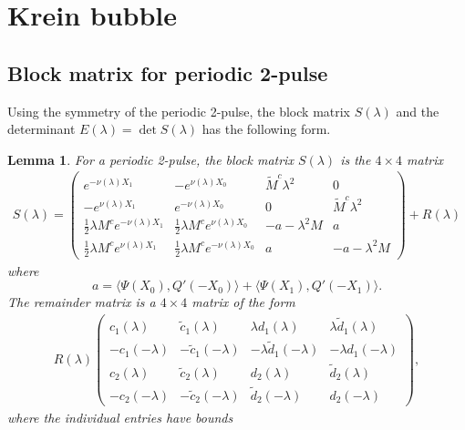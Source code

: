 \documentclass[10pt,reqno]{amsart}
\theoremstyle{plain}
\newtheorem{lemma}[theorem]{Lemma}
\theoremstyle{definition}
\theoremstyle{remark}
\numberwithin{theorem}{section}
\numberwithin{equation}{section}
\begin{document}
\section{Krein bubble}

\subsection{Block matrix for periodic 2-pulse}

Using the symmetry of the periodic 2-pulse, the block matrix $S(\lambda)$ and the determinant $E(\lambda) = \det S(\lambda)$ has the following form.

\begin{lemma}\label{lemma:2blockmatrix}
For a periodic 2-pulse, the block matrix $S(\lambda)$ is the $4 \times 4$ matrix
\begin{align}\label{dpSmatrix}
S(\lambda) = 
\begin{pmatrix}
e^{-\nu(\lambda)X_1} & -e^{\nu(\lambda)X_0} & \tilde{M}^c \lambda^2 & 0 \\
-e^{\nu(\lambda)X_1} & e^{-\nu(\lambda)X_0} & 0 & \tilde{M}^c \lambda^2 \\
\frac{1}{2}\lambda M^c e^{-\nu(\lambda)X_1} & \frac{1}{2}\lambda M^ce^{\nu(\lambda)X_0} &-a-\lambda^2 M & a \\
\frac{1}{2}\lambda M^c e^{\nu(\lambda)X_1} & \frac{1}{2}\lambda M^c e^{-\nu(\lambda)X_0}  & a & -a-\lambda^2 M
\end{pmatrix} + R(\lambda)
\end{align}
where
\begin{equation}\label{2pa}
a = \langle \Psi(X_0), Q'(-X_0) \rangle + \langle \Psi(X_1), Q'(-X_1) \rangle.
\end{equation}
The remainder matrix is a $4 \times 4$ matrix of the form
\begin{align}
R(\lambda)
\begin{pmatrix} 
c_1(\lambda) & \tilde{c}_1(\lambda) & \lambda d_1(\lambda) & \lambda \tilde{d}_1(\lambda) \\ 
-c_1(-\lambda) & -\tilde{c}_1(-\lambda) & -\lambda \tilde{d}_1(-\lambda) & -\lambda d_1(-\lambda) \\ 
c_2(\lambda) & \tilde{c}_2(\lambda) & d_2(\lambda) & \tilde{d}_2(\lambda) \\ 
-c_2(-\lambda) & -\tilde{c}_2(-\lambda) & \tilde{d}_2(-\lambda) & d_2(-\lambda)
\end{pmatrix},
\end{align}
where the individual entries have bounds
\begin{align*}

\end{align*}
\end{lemma}
\end{document}
